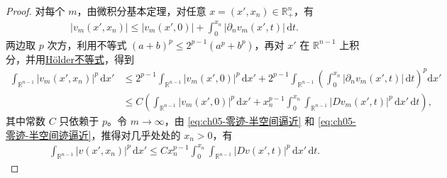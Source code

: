 \documentclass[../../main.tex]{subfiles}%
\begin{document}
\begin{proof}
对每个 $m$，由微积分基本定理，对任意 $x=(x',x_{n})\in\mathbb{R}^{n}_{+}$，有
\begin{align*}
|v_{m}(x',x_{n})|\leqslant |v_{m}(x',0)|+\int_{0}^{x_{n}}|\partial_{n}v_{m}(x',t)|\,\mathrm{d}t.
\end{align*}
两边取 $p$ 次方，利用不等式 $(a+b)^{p}\leqslant 2^{p-1}(a^{p}+b^{p})$，再对 $x'$ 在 $\mathbb{R}^{n-1}$ 上积分，并用\hyperref[Real Analysis-theorem:实变函数--Hölder不等式]{Hölder不等式}，得到
\begin{align*}
\int_{\mathbb{R}^{n-1}}|v_{m}(x',x_{n})|^{p}\,\mathrm{d}x'
&\leqslant 2^{p-1}\int_{\mathbb{R}^{n-1}}|v_{m}(x',0)|^{p}\,\mathrm{d}x' +2^{p-1}\int_{\mathbb{R}^{n-1}}\left(\int_{0}^{x_{n}}|\partial_{n}v_{m}(x',t)|\,\mathrm{d}t\right)^{p}\mathrm{d}x'\\
&\leqslant C\left(\int_{\mathbb{R}^{n-1}}|v_{m}(x',0)|^{p}\,\mathrm{d}x'
+x_{n}^{p-1}\int_{0}^{x_{n}}\int_{\mathbb{R}^{n-1}}|Dv_{m}(x',t)|^{p}\,\mathrm{d}x'\,\mathrm{d}t\right),
\end{align*}
其中常数 $C$ 只依赖于 $p$。令 $m\to\infty$，由 \eqref{eq:ch05-零迹-半空间逼近} 和 \eqref{eq:ch05-零迹-半空间迹逼近}，推得对几乎处处的 $x_{n}>0$，有
\begin{align}\label{eq:ch05-零迹-半空间估计}
\int_{\mathbb{R}^{n-1}}|v(x',x_{n})|^{p}\,\mathrm{d}x'
\leqslant Cx_{n}^{p-1}\int_{0}^{x_{n}}\int_{\mathbb{R}^{n-1}}|Dv(x',t)|^{p}\,\mathrm{d}x'\,\mathrm{d}t.
\end{align}


\end{proof}
\end{document}
